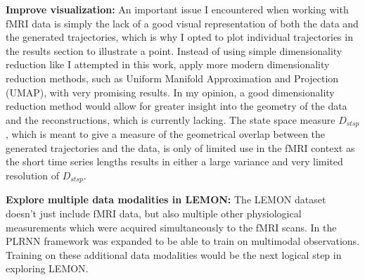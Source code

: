 \textbf{Improve visualization: } An important issue I encountered when working with fMRI data is simply the lack of a good visual representation of both the data and the generated 
trajectories, which is why I opted to plot individual trajectories in the results section to illustrate a point. Instead of using simple dimensionality reduction like I attempted 
in this work, \cite{gonzalez2023manifold} apply more modern dimensionality reduction methods, such as Uniform Manifold Approximation and Projection (UMAP), with very promising results.
In my opinion, a good dimensionality reduction method would allow for greater insight into the geometry of the data and the reconstructions, which is currently lacking. The state space 
measure $D_{stsp}$, which is meant to give a measure of the geometrical overlap between the generated trajectories and the data, is only of limited use in the fMRI context as the short 
time series lengths results in either a large variance and very limited resolution of $D_{stsp}$. 

\textbf{Explore multiple data modalities in LEMON: } The LEMON dataset doesn't just include fMRI data, but also multiple other physiological measurements which were 
acquired simultaneously to the fMRI scans. In \cite{brenner2022multimodal} the PLRNN framework was expanded to be able to train on multimodal observations. 
Training on these additional data modalities would be the next logical step in exploring LEMON. 

